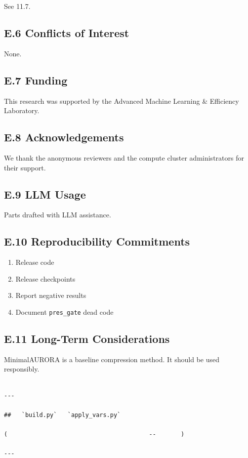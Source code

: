See  11.7.

\subsection{E.6 Conflicts of Interest}

None.

\subsection{E.7 Funding}

This research was supported by the Advanced Machine Learning \& Efficiency Laboratory.

\subsection{E.8 Acknowledgements}

We thank the anonymous reviewers and the compute cluster administrators for their support.

\subsection{E.9 LLM Usage}

Parts drafted with LLM assistance.

\subsection{E.10 Reproducibility Commitments}

\begin{enumerate}
\item Release code
\item Release checkpoints
\item Report negative results
\item Document \texttt{pres\_gate} dead code

\end{enumerate}
\subsection{E.11 Long-Term Considerations}

MinimalAURORA is a baseline compression method. It should be used 
responsibly.
\begin{lstlisting}

---

##   `build.py`   `apply_vars.py`

(                                        --       )

---
\end{lstlisting}